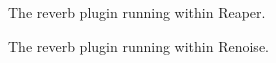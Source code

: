 \begin{figure}[h] %
	\begin{center}
		\caption{The reverb plugin running within Reaper.}
	\end{center}
\end{figure}
\begin{figure}[h] %
	\begin{center}
		\caption{The reverb plugin running within Renoise.}
	\end{center}
\end{figure}
